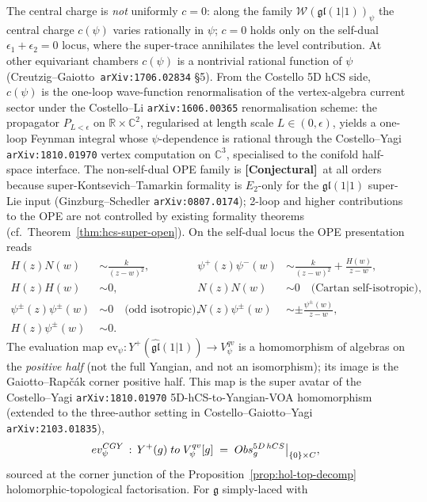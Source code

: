 \documentclass[11pt]{amsart}
\theoremstyle{definition}
\providecommand{\cW}{\mathcal{W}}
\providecommand{\R}{\mathbb{R}}
\providecommand{\C}{\mathbb{C}}
\providecommand{\fgl}{\mathfrak{gl}}
\providecommand{\fg}{\mathfrak{g}}
\providecommand{\ClaimStatusConjectured}{\textbf{\textsf{[Conjectural]}}}
\begin{document}
The central charge is \emph{not} uniformly $c = 0$: along the family
$\cW(\fgl(1|1))_\psi$ the central charge $c(\psi)$ varies rationally in
$\psi$; $c = 0$ holds only on the self-dual $\epsilon_1 + \epsilon_2 = 0$
locus, where the super-trace annihilates the level contribution. At other
equivariant chambers $c(\psi)$ is a nontrivial rational function of $\psi$
(Creutzig--Gaiotto~\texttt{arXiv:1706.02834} §5). From the Costello 5D hCS
side, $c(\psi)$ is the one-loop wave-function renormalisation of the
vertex-algebra current sector under the Costello--Li
\texttt{arXiv:1606.00365} renormalisation scheme: the propagator
$P_{L<\epsilon}$ on $\R\times\C^2$, regularised at length scale
$L\in(0,\epsilon)$, yields a one-loop Feynman integral whose
$\psi$-dependence is rational through the Costello--Yagi
\texttt{arXiv:1810.01970} vertex computation on $\C^3$, specialised to
the conifold half-space interface. The non-self-dual OPE family is
\ClaimStatusConjectured\ at all orders because super-Kontsevich--Tamarkin
formality is $E_2$-only for the $\fgl(1|1)$ super-Lie input
(Ginzburg--Schedler \texttt{arXiv:0807.0174}); 2-loop and higher
contributions to the OPE are not controlled by existing formality
theorems (cf.\ Theorem~\ref{thm:hcs-super-open}). On the self-dual locus
the OPE presentation reads
\[
\begin{aligned}
  H(z) N(w) &\sim \tfrac{k}{(z-w)^2}, &
  \psi^+(z) \psi^-(w) &\sim \tfrac{k}{(z-w)^2} + \tfrac{H(w)}{z-w}, \\
  H(z) H(w) &\sim 0, & N(z) N(w) &\sim 0 \quad \text{(Cartan self-isotropic)}, \\
  \psi^\pm(z) \psi^\pm(w) &\sim 0 \quad \text{(odd isotropic)}, &
  N(z) \psi^\pm(w) &\sim \pm \tfrac{\psi^\pm(w)}{z-w}, \\
  H(z) \psi^\pm(w) &\sim 0. & &
\end{aligned}
\]
The evaluation map $\mathrm{ev}_\psi : Y^+(\widehat{\fgl}(1|1)) \to V^{qv}_\psi$
is a homomorphism of algebras on the \emph{positive half} (not the full
Yangian, and not an isomorphism); its image is the Gaiotto--Rapčák corner
positive half. This map is the super avatar of the Costello--Yagi
\texttt{arXiv:1810.01970} 5D-hCS-to-Yangian-VOA homomorphism (extended
to the three-author setting in Costello--Gaiotto--Yagi
\texttt{arXiv:2103.01835}),
\[
  \mathrm{ev}^{\mathrm{CGY}}_\psi \,:\, Y^+(\widehat\fg) \;\to\;
  V^{qv}_\psi[\fg]\;=\;\mathrm{Obs}^{\mathrm{5D\,hCS}}_\fg\big|_{\{0\}\times\C},
\]
sourced at the corner junction of the Proposition~\ref{prop:hol-top-decomp}
holomorphic-topological factorisation. For $\fg$ simply-laced with
\end{document}
